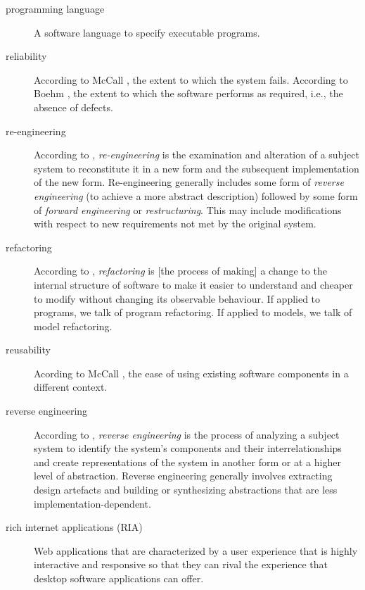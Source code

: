 \documentclass[11pt, oneside]{article}
\begin{document}
\begin{description}
\item[programming language]
A software language to specify executable programs.



\item[reliability]
According to McCall \cite{mccall1977factors}, the extent to which the system fails.
According to Boehm \cite{opac-b1104886}, the extent to which the software performs as required, i.e., the absence of defects.


\item[re-engineering]
According to \cite{ChikofskyCross1990}, \emph{re-engineering} is the examination and alteration of a subject system to reconstitute it in a new form and the subsequent implementation of the new form. Re-engineering generally includes some form of \emph{reverse engineering} (to achieve a more abstract description) followed by some form of \emph{forward engineering} or \emph{restructuring}. This may include modifications with respect to new requirements not met by the original system.

\item[refactoring]
According to \cite{Fowler1999}, \emph{refactoring} is [the process of making] a change to the internal structure of software to make it easier to understand and cheaper to modify without changing its observable behaviour. If applied to programs, we talk of program refactoring. If applied to models, we talk of model refactoring.

\item[reusability]
Acording to McCall \cite{mccall1977factors}, the ease of using existing software components in a different context.

\item[reverse engineering]
According to \cite{ChikofskyCross1990}, \emph{reverse engineering} is the process of analyzing a subject system to identify the system's components and their interrelationships and create representations of the system in another form or at a higher level of abstraction. Reverse engineering generally involves extracting design artefacts and building or synthesizing abstractions that are less implementation-dependent.

\item[rich internet applications (RIA)]
Web applications that are characterized by a user experience that is highly interactive and responsive so that they can rival the experience that desktop software applications can offer.


\end{description}
\end{document}

